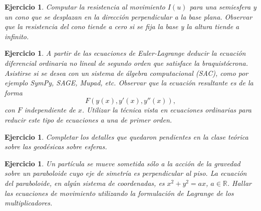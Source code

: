 \documentclass{article}
\newcounter{ejer}
\newtheorem{ejercicio}[ejer]{Ejercicio}}
\newcommand{\rr}{\mathbb{R}}
\begin{document}
 \begin{ejercicio} Computar la resistencia al movimiento $I(u)$ para una semiesfera y un cono que se desplazan en la dirección  perpendicular a la base plana.  Observar que la resistencia del cono tiende a cero si se fija la base y la altura tiende a infinito.
   \end{ejercicio}

 \begin{ejercicio} A partir de las ecuaciones de Euler-Lagrange deducir la ecuación diferencial ordinaria no lineal de segundo orden que satisface la braquistócrona. Asistirse si se desea con un sistema de álgebra computacional (SAC), como por ejemplo SymPy, SAGE, Mupad, etc.   Observar que la ecuación resultante es de la forma
  \[F(y(x),y'(x),y''(x)),\]
 con $F$ independiente de $x$. Utilizar la técnica vista en ecuaciones ordinarias para reducir este tipo de ecuaciones a una de primer orden.
 \end{ejercicio}

\begin{ejercicio} Completar los detalles que quedaron pendientes en la clase teórica sobre las geodésicas sobre esferas.
\end{ejercicio}

 \begin{ejercicio} Un partícula se mueve sometida sólo a la acción de la gravedad  sobre un paraboloide cuyo eje de simetría es perpendicular al piso. La ecuación del paraboloide, en algún sistema de coordenadas, es  $x^2+y^2=ax$, $a\in\rr$. Hallar las ecuaciones de movimiento utilizando la formulación de Lagrange de los multiplicadores.
\end{ejercicio}
\end{document}
